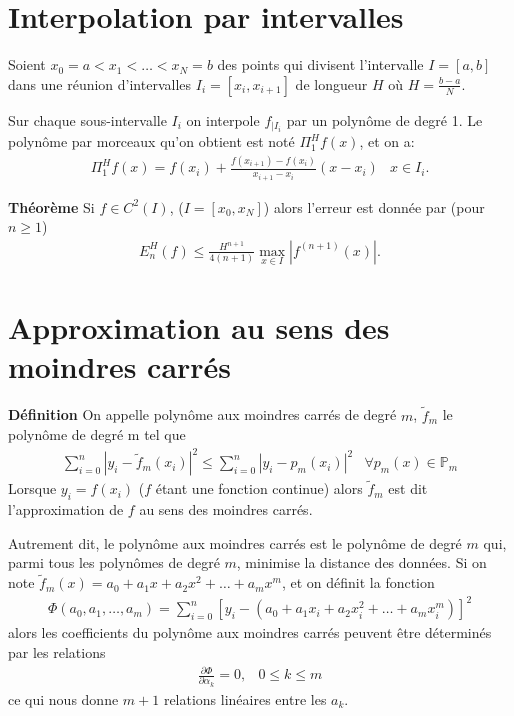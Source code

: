 \section{Interpolation par intervalles}
Soient $x_0 = a < x_1 < \dots < x_N = b$ des points qui divisent l’intervalle $I = [a, b]$ 
dans une réunion d’intervalles $I_i= [x_i, x_{i+1}]$ de longueur $H$ où $H=\frac{b-a}{N}$.

Sur chaque sous-intervalle $I_i$ on interpole $f_{|I_i}$
par un polynôme de degré 1. Le polynôme par morceaux qu’on obtient est noté $\Pi_1^Hf(x)$, et on a:
\begin{eqnarray}
	\Pi_1^Hf(x)=f(x_i)+\frac{f(x_{i+1})-f(x_i)}{x_{i+1}-x_i}(x-x_i)&x\in I_i.
\end{eqnarray}

\textbf{Théorème} 
Si $f \in C^2(I)$, ($I = [x_0 , x_N]$) alors l'erreur est donnée par (pour $n\geq1$)
\begin{eqnarray}
	E_n^H(f)\leq\frac{H^{n+1}}{4(n+1)}\max_{x\in I}|f^{(n+1)}(x)|.
\end{eqnarray}
\section{Approximation au sens des moindres carrés}
\textbf{Définition} On appelle polynôme aux moindres carrés de degré $m$,
$\tilde f_m$ 
le polynôme de degré m tel que
\begin{eqnarray}
	\sum_{i=0}^n|y_i-\tilde f_m(x_i)|^2\leq\sum_{i=0}^{n}|y_i-p_m(x_i)|^2&\forall p_m(x)\in\mathbb P_m
\end{eqnarray}
Lorsque $y_i = f(x_i)$ ($f$ étant une fonction continue) alors 
$\tilde f_m$
est dit l’approximation de $f$ au sens des moindres carrés.

Autrement dit, le polynôme aux moindres carrés est le polynôme de degré $m$ 
qui, parmi tous les polynômes de degré $m$, minimise la distance des données. 
Si on note 
$\tilde f_m(x) = a_0 + a_1x + a_2x^2 + \dots + a_mx^m$, et on définit la fonction
\begin{eqnarray}
	\Phi(a_0,a_1,\dots,a_m)=\sum_{i=0}^n[y_i-(a_0+a_1x_i + a_2 x_i^2 + \dots + a_mx_i^m)]^2
\end{eqnarray}
alors les coefficients du polynôme aux moindres carrés peuvent être 
déterminés par les relations
\begin{eqnarray}
	\frac{\partial\Phi}{\partial\alpha_k}=0,&0\leq k\leq m
\end{eqnarray}
ce qui nous donne $m + 1$ relations linéaires entre les $a_k$.

